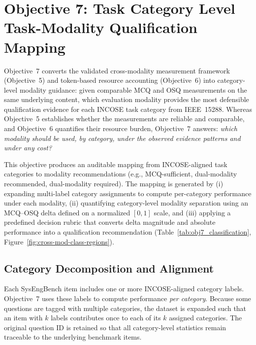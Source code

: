 \section{Objective 7: Task Category Level Task-Modality Qualification Mapping}
\label{sec:ch3_obj7_category_taskmodality}

Objective~7 converts the validated cross-modality measurement framework (Objective~5) and token-based resource accounting (Objective~6) into category-level modality guidance: given comparable MCQ and OSQ measurements on the same underlying content, which evaluation modality provides the most defensible qualification evidence for each INCOSE task category from IEEE~15288. Whereas Objective~5 establishes whether the measurements are reliable and comparable, and Objective~6 quantifies their resource burden, Objective~7 answers: \emph{which modality should be used, by category, under the observed evidence patterns and under any cost?}

This objective produces an auditable mapping from INCOSE-aligned task categories to modality recommendations (e.g., MCQ-sufficient, dual-modality recommended, dual-modality required). The mapping is generated by (i) expanding multi-label category assignments to compute per-category performance under each modality, (ii) quantifying category-level modality separation using an MCQ--OSQ delta defined on a normalized $[0,1]$ scale, and (iii) applying a predefined decision rubric that converts delta magnitude and absolute performance into a qualification recommendation (Table~\ref{tab:obj7_classification}, Figure~\ref{fig:cross-mod-class-regions}).

\subsection{Category Decomposition and Alignment}
\label{subsec:ch3_obj7_category_decomposition}

Each SysEngBench item includes one or more INCOSE-aligned category labels. Objective~7 uses these labels to compute performance \emph{per category}. Because some questions are tagged with multiple categories, the dataset is expanded such that an item with $k$ labels contributes once to each of its $k$ assigned categories. The original question ID is retained so that all category-level statistics remain traceable to the underlying benchmark items.

